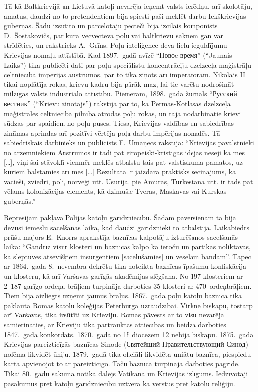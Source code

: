 \documentclass[twoside,a5paper,12pt,fleqn,openany]{extbook}
\newcommand{\rutxti}[1]{\textrussian{#1}}
\newcommand{\citespace}{[\dots{}]}
\begin{document}
Tā kā Baltkrievijā un Lietuvā katoļi nevarēja ieņemt valsts ierēdņu, arī skolotāju, amatus, daudzi no to pretendentiem bija spiesti paši meklēt darbu Iekškrievijas guberņās. Šādu izsūtīto un pārceļotāju pēcteči bija izcilais komponists D.~Šostakovičs, par kura vecvectēva poļu vai baltkrievu saknēm gan var strīdēties, un rakstnieks A.~Grīns. Poļu inteliģence deva lielu ieguldījumu Krievijas nomaļu attīstībā. Kad 1897.~gadā avīzē ``\rutxti{Новоe время}'' (``Jaunais Laiks'') tika publicēti dati par poļu speciālistu koncentrāciju dzelzceļa maģistrāļu celtniecībā impērijas austrumos, par to tika ziņots arī imperatoram. Nikolajs II tikai noplātīja rokas, krievu kadru bija pārāk maz, lai tie varētu nodrošināt milzīgās valsts industriālo attīstību. Piemēram, 1898.~gadā žurnāls ``\rutxti{Русский вестник}'' (``Krievu ziņotājs'') rakstīja par to, ka Permas-Kotlasas dzelzceļa maģistrāles celtniecība pilnībā atrodas poļu rokās, un tajā nodarbinātie krievi sūdzas par spaidiem no poļu puses. Tiesa, Krievijas valdības un sabiedrības zināmas aprindas arī pozitīvi vērtēja poļu darbu impērijas nomalēs. Tā sabiedriskais darbinieks un publicists F.~Umaņecs rakstīja: ``Krievijas pavalstnieki no ārzemniekiem Austrumos ir tādi pat eiropeiski-kristīgās idejas nesēji kā mēs \citespace{}, viņi šai stāvoklī vienmēr meklēs atbalstu tais pat valstiskuma pamatos, uz kuriem balstāmies arī mēs \citespace{} Rezultātā ir jāizdara praktisks secinājums, ka vācieši, zviedri, poļi, norvēģi utt. Usūrijā, pie Amūras, Turkestānā utt. ir tāds pat vēlams kolonizācijas elements, kā dzimušie Tveras, Maskavas vai Kurskas guberņās.''

Represijām pakļāva Polijas katoļu garīdzniecību. Šādam pavērsienam tā bija devusi iemeslu sacelšanās laikā, kad daudzi garīdznieki to atbalstīja. Laikabiedrs prūšu majors E.~Knorrs aprakstīja baznīcas kalpotāju izturēšanos sacelšanās laikā: ``Gandrīz visur klosteri un baznīcas kalpo kā ieroču un pārtikas noliktavas, kā slēptuves atsevišķiem insurgentiem [sacēlušamies] un veselām bandām''. Tāpēc ar 1864.~gada 8.~novembra dekrētu tika noteikta baznīcas īpašumu konfiskācija un klosteru, kā arī Varšavas garīgās akadēmijas slēgšana. No 197 klosteriem ar 2~187 garīgo ordeņu brāļiem turpināja darboties 35 klosteri ar 470~ordeņbrāļiem. Tiem bija aizliegts uzņemt jaunus brāļus. 1867.~gadā poļu katoļu baznīca tika pakļauta Romas katoļu kolēģijas Pēterburgā uzraudzībai. Virkne bīskapu, tostarp arī Varšavas, tika izsūtīti uz Krieviju. Romas pāvests ar to visu nevarēja samierināties, ar Krieviju tika pārtrauktas attiecības un beidza darboties 1847.~gada konkordāts. 1870.~gadā no 15 diocēzēm 12 nebija bīskapu. 1875.~gadā Krievijas pareizticīgās baznīcas Sinode (\rutxti{Святейший Правительствующий Синод}) nolēma likvidēt ūniju. 1879.~gadā tika oficiāli likvidēta uniātu baznīca, piespiedu kārtā apvienojot to ar pareizticīgo. Taču baznīca turpināja darboties pagrīdē. Tikai 80.~gadu sākumā notika daļējs Vatikāna un Krievijas izlīgums. Iedzīvotāji pasākumus pret katoļu garīdzniecību uztvēra kā vērstus pret katoļu reliģiju.
\end{document}
